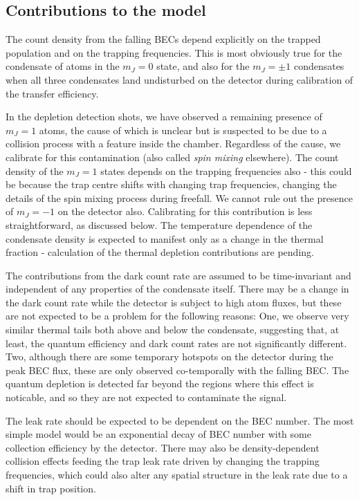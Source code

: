 \documentclass[%
 reprint,
 amsmath,amssymb,
 aps,
]{revtex4-1}
\begin{document}
\subsection{Contributions to the model}

The count density from the falling BECs depend explicitly on the trapped population and on the trapping frequencies. 
This is most obviously true for the condensate of atoms in the $m_J=0$ state, and also for the $m_J=\pm 1$ condensates when all three condensates land undisturbed on the detector during calibration of the transfer efficiency.

In the depletion detection shots, we have observed a remaining presence of $m_J=1$ atoms, the cause of which is unclear but is suspected to be due to a collision process with a feature inside the chamber. 
Regardless of the cause, we calibrate for this contamination (also called \textit{spin mixing} elsewhere). 
The count density of the $m_J=1$ states depends on the trapping frequencies also - this could be because the trap centre shifts with changing trap frequencies, changing the details of the spin mixing process during freefall. 
We cannot rule out the presence of $m_J=-1$ on the detector also. Calibrating for this contribution is less straightforward, as discussed below. 
The temperature dependence of the condensate density is expected to manifest only as a change in the thermal fraction - calculation of the thermal depletion contributions are pending. 

The contributions from the dark count rate are assumed to be time-invariant and independent of any properties of the condensate itself. 
There may be a change in the dark count rate while the detector is subject to high atom fluxes, but these are not expected to be a problem for the following reasons: 
One, we observe very similar thermal tails both above and below the condensate, suggesting that, at least, the quantum efficiency and dark count rates are not significantly different. 
Two, although there are some temporary hotspots on the detector during the peak BEC flux, these are only observed co-temporally with the falling BEC. 
The quantum depletion is detected far beyond the regions where this effect is noticable, and so they are not expected to contaminate the signal. 

The leak rate should be expected to be dependent on the BEC number. 
The most simple model would be an exponential decay of BEC number with some collection efficiency by the detector. 
There may also be density-dependent collision effects feeding the trap leak rate driven by changing the trapping frequencies, which could also alter any spatial structure in the leak rate due to a shift in trap position. 
\end{document}
